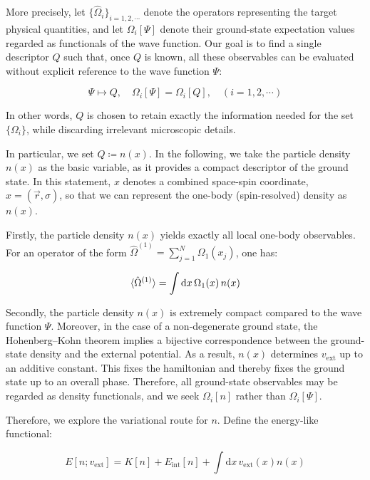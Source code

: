 More precisely, let $\{\hat{\Omega}_i\}_{i=1,2,\cdots}$ denote the operators representing the target physical quantities, and let $\Omega_i[\Psi]$ denote their ground-state expectation values regarded as functionals of the wave function.
Our goal is to find a single descriptor $Q$ such that, once $Q$ is known, all these observables can be evaluated without explicit reference to the wave function $\Psi$:

\begin{equation}
    \Psi \mapsto Q,\quad\Omega_i[\Psi] = \Omega_i[Q],\quad(i=1,2,\cdots)
\label{descriptor_Q_mapping}
\end{equation}

In other words, $Q$ is chosen to retain exactly the information needed for the set $\{\Omega_i\}$, while discarding irrelevant microscopic details.

In particular, we set $Q \coloneqq n(x)$. In the following, we take the particle density $n(x)$ as the basic variable, as it provides a compact descriptor of the ground state. In this statement, $x$ denotes a combined space-spin coordinate, $x=(\vec{r},\sigma)$, so that we can represent the one-body (spin-resolved) density as $n(x)$.

Firstly, the particle density $n(x)$ yields exactly all local one-body observables. For an operator of the form $\hat{\Omega}^{(1)}=\sum_{j=1}^N \Omega_1(x_j)$, one has:

\begin{equation}
    \braket{\hat{\Omega}^{(1)}}=\int \mathrm{d}x\,\Omega_1(x)\,n(x)
\label{one-body_observables}
\end{equation}

Secondly, the particle density $n(x)$ is extremely compact compared to the wave function $\Psi$.
Moreover, in the case of a non-degenerate ground state, the Hohenberg--Kohn theorem implies a bijective correspondence between the ground-state density and the external potential.
As a result, $n(x)$ determines $v_\mathrm{ext}$ up to an additive constant.
This fixes the hamiltonian and thereby fixes the ground state up to an overall phase.
Therefore, all ground-state observables may be regarded as density functionals, and we seek $\Omega_i[n]$ rather than $\Omega_i[\Psi]$.

Therefore, we explore the variational route for $n$. Define the energy-like functional:

\begin{equation}
    E[n;v_\mathrm{ext}]=K[n]+E_\mathrm{int}[n]+\int\mathrm{d}x\,v_\mathrm{ext}(x)n(x)
\label{energy-like_functional}
\end{equation}

